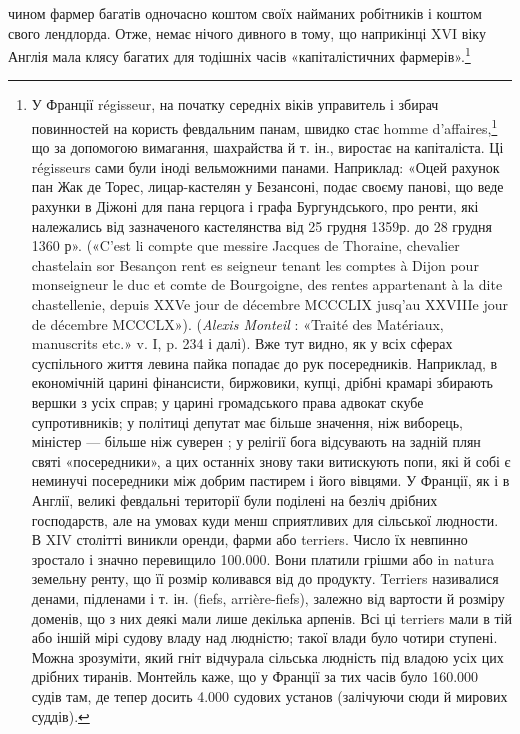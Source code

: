 чином фармер багатів одночасно коштом своїх найманих
робітників і коштом свого лендлорда. Отже, немає нічого дивного
в тому, що наприкінці XVI віку Англія мала клясу багатих
для тодішніх часів «капіталістичних фармерів».\footnote{
У Франції régisseur, на початку середніх віків управитель і збирач
повинностей на користь февдальним панам, швидко стає homme
d’affaires,\footnote*{
— ділком. \emph{Ред.}
} що за допомогою вимагання, шахрайства й т. ін., виростає
на капіталіста. Ці régisseurs сами були іноді вельможними панами. Наприклад:
«Оцей рахунок пан Жак де Торес, лицар-кастелян у
Безансоні, подає своєму панові, що веде рахунки в Діжоні для пана
герцога і графа Бургундського, про ренти, які належались від зазначеного
кастелянства від 25 грудня 1359р. до 28 грудня 1360 р». («C’est
li compte que messire Jacques de Thoraine, chevalier chastelain sor Besançon
rent es seigneur tenant les comptes à Dijon pour monseigneur le
duc et comte de Bourgoigne, des rentes appartenant à la dite chastellenie,
depuis XXVe jour de décembre MCCCLIX jusq’au XXVIIIe jour de décembre
MCCCLX»). (\emph{Alexis Monteil} : «Traité des Matériaux, manuscrits etc.» v. I,
p. 234 і далі). Вже тут видно, як у всіх сферах суспільного життя левина
пайка попадає до рук посередників. Наприклад, в економічній царині фінансисти,
биржовики, купці, дрібні крамарі збирають вершки з усіх справ;
у царині громадського права адвокат скубе супротивників; у політиці
депутат має більше значення, ніж виборець, міністер — більше ніж суверен
; у релігії бога відсувають на задній плян святі «посередники», а цих
останніх знову таки витискують попи, які й собі є неминучі посередники
між добрим пастирем і його вівцями. У Франції, як і в Англії, великі
февдальні території були поділені на безліч дрібних господарств, але
на умовах куди менш сприятливих для сільської людности. В XIV столітті
виникли оренди, фарми або terriers. Число їх невпинно зростало і
значно перевищило 100.000. Вони платили грішми або in natura земельну
ренту, що її розмір коливався від  до  продукту. Terriers називалися
денами, підленами і т. ін. (fiefs, arrière-fiefs), залежно від вартости й
розміру доменів, що з них деякі мали лише декілька арпенів. Всі ці
terriers мали в тій або іншій мірі судову владу над людністю; такої влади
було чотири ступені. Можна зрозуміти, який гніт відчурала сільська
людність під владою усіх цих дрібних тиранів. Монтейль каже, що у Франції
за тих часів було 160.000 судів там, де тепер досить 4.000 судових установ
(залічуючи сюди й мирових суддів).
}


